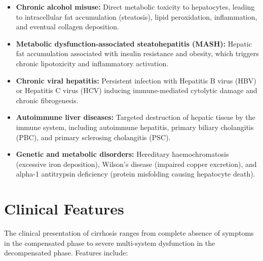 \begin{itemize}
    \item \textbf{Chronic alcohol misuse:} Direct metabolic toxicity to hepatocytes, leading to intracellular fat accumulation (steatosis), lipid peroxidation, inflammation, and eventual collagen deposition.
    \item \textbf{Metabolic dysfunction-associated steatohepatitis (MASH):} Hepatic fat accumulation associated with insulin resistance and obesity, which triggers chronic lipotoxicity and inflammatory activation.
    \item \textbf{Chronic viral hepatitis:} Persistent infection with Hepatitis B virus (HBV) or Hepatitis C virus (HCV) inducing immune-mediated cytolytic damage and chronic fibrogenesis.
    \item \textbf{Autoimmune liver diseases:} Targeted destruction of hepatic tissue by the immune system, including autoimmune hepatitis, primary biliary cholangitis (PBC), and primary sclerosing cholangitis (PSC).
    \item \textbf{Genetic and metabolic disorders:} Hereditary haemochromatosis (excessive iron deposition), Wilson's disease (impaired copper excretion), and alpha-1 antitrypsin deficiency (protein misfolding causing hepatocyte death).
\end{itemize}

\section*{Clinical Features}
The clinical presentation of cirrhosis ranges from complete absence of symptoms in the compensated phase to severe multi-system dysfunction in the decompensated phase. Features include:

